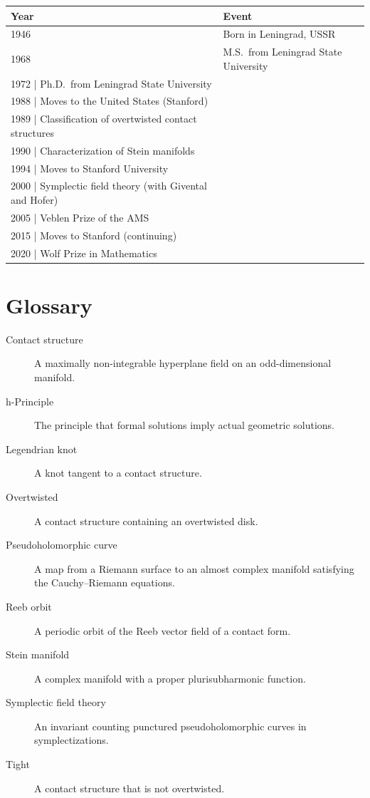 \begin{tabularx}{\linewidth}{|p{1.5cm}|>{\raggedright\arraybackslash}X|}
\hline
\textbf{Year} & \textbf{Event} \\ \hline
1946 & Born in Leningrad, USSR \\ \hline
1968 & M.S.\ from Leningrad State University \\ \hline
1972 | Ph.D.\ from Leningrad State University \\ \hline
1988 | Moves to the United States (Stanford) \\ \hline
1989 | Classification of overtwisted contact structures \\ \hline
1990 | Characterization of Stein manifolds \\ \hline
1994 | Moves to Stanford University \\ \hline
2000 | Symplectic field theory (with Givental and Hofer) \\ \hline
2005 | Veblen Prize of the AMS \\ \hline
2015 | Moves to Stanford (continuing) \\ \hline
2020 | Wolf Prize in Mathematics \\ \hline
\end{tabularx}

\section*{Glossary}

\begin{description}
    \item[Contact structure] A maximally non-integrable hyperplane field on an odd-dimensional manifold.
    \item[h-Principle] The principle that formal solutions imply actual geometric solutions.
    \item[Legendrian knot] A knot tangent to a contact structure.
    \item[Overtwisted] A contact structure containing an overtwisted disk.
    \item[Pseudoholomorphic curve] A map from a Riemann surface to an almost complex manifold satisfying the Cauchy--Riemann equations.
    \item[Reeb orbit] A periodic orbit of the Reeb vector field of a contact form.
    \item[Stein manifold] A complex manifold with a proper plurisubharmonic function.
    \item[Symplectic field theory] An invariant counting punctured pseudoholomorphic curves in symplectizations.
    \item[Tight] A contact structure that is not overtwisted.
\end{description}

